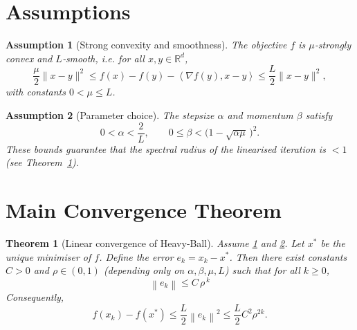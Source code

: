 \documentclass[11pt]{article}
\newtheorem{theorem}{Theorem}
\newtheorem{assumption}{Assumption}
\newcommand{\norm}[1]{\left\lVert#1\right\rVert}
\newcommand{\ip}[2]{\left\langle #1,#2\right\rangle}
\newcommand{\grad}{\nabla}
\begin{document}
\section*{Assumptions}
\begin{assumption}[Strong convexity and smoothness]\label{asm:smoothSC}
The objective $f$ is $\mu$‑strongly convex and $L$‑smooth, i.e. for all
$x,y\in\mathbb R^{d}$,
\[
\frac{\mu}{2}\|x-y\|^{2}\le f(x)-f(y)-\ip{\grad f(y)}{x-y}
\le\frac{L}{2}\|x-y\|^{2},
\]
with constants $0<\mu\le L$.
\end{assumption}
\begin{assumption}[Parameter choice]\label{asm:params}
The stepsize $\alpha$ and momentum $\beta$ satisfy
\[
0<\alpha<\frac{2}{L},\qquad
0\le\beta<\bigl(1-\sqrt{\alpha\mu}\,\bigr)^{2}.
\]
These bounds guarantee that the spectral radius of the linearised
iteration is $<1$ (see Theorem~\ref{thm:linear}).
\end{assumption}

\section*{Main Convergence Theorem}
\begin{theorem}[Linear convergence of Heavy‑Ball]\label{thm:linear}
Assume \ref{asm:smoothSC} and \ref{asm:params}.  
Let $x^{*}$ be the unique minimiser of $f$.  
Define the error $e_{k}=x_{k}-x^{*}$.  
Then there exist constants $C>0$ and $\rho\in(0,1)$ (depending only on
$\alpha,\beta,\mu,L$) such that for all $k\ge 0$,
\[
\boxed{\;\norm{e_{k}}\le C\,\rho^{\,k}\;}
\tag{1}
\]
Consequently,
\[
f(x_{k})-f(x^{*})\le \frac{L}{2}\norm{e_{k}}^{2}
\le \frac{L}{2}C^{2}\rho^{2k}.
\]
\end{theorem}

\end{document}
